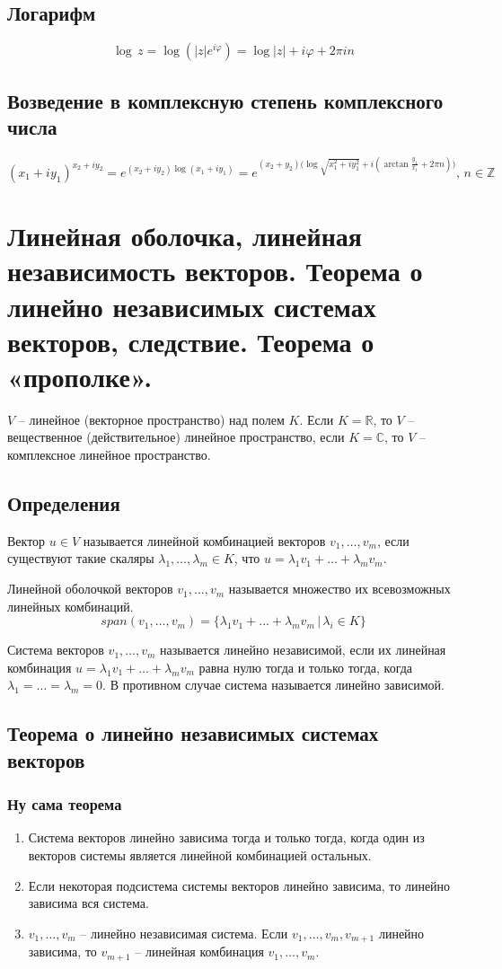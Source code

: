\documentclass{article}
\newcommand{\R}{\mathbb R}
\newcommand{\Z}{\mathbb Z}
\begin{document}
\subsection{Логарифм}
$$ \log\,z=\log(|z|e^{i\varphi})=\log|z|+i\varphi+2\pi i n $$

\subsection{Возведение в комплексную степень комплексного числа}
$$ (x_1+iy_1)^{x_2+iy_2}=e^{(x_2+iy_2)\log(x_1+iy_1)}=e^{(x_2+y_2)\big(\log\sqrt{x_1^2+i y_1^2}+i(\arctan\frac{y_1}{x_1}+2\pi n)\big)},\,n\in\Z$$

\newpage
\section{Линейная оболочка, линейная независимость векторов. Теорема о линейно независимых системах векторов,
следствие. Теорема о «прополке».}
$V$ -- линейное (векторное пространство) над полем $K$. Если $K=\R$, то $V$ -- вещественное
(действительное) линейное пространство, если $K=\mathbb{C}$, то $V$ -- комплексное линейное
пространство.

\subsection{Определения}
Вектор $u\in V$ называется линейной комбинацией векторов $v_1,\ldots,v_m$, если существуют такие скаляры $\lambda_1,\ldots,\lambda_m\in K$, что $u=\lambda_1v_1+\ldots+\lambda_m v_m$.

Линейной оболочкой векторов $v_1,\ldots,v_m$ называется множество их всевозможных линейных комбинаций.
$$ span(v_1,\ldots,v_m)=\{\lambda_1v_1+\ldots+\lambda_m v_m\,|\,\lambda_i\in K\} $$

Система векторов $v_1,\ldots,v_m$ называется линейно независимой, если их линейная комбинация $u=\lambda_1v_1+\ldots+\lambda_m v_m$ равна нулю тогда и только тогда, когда $\lambda_1=\ldots=\lambda_m=0$. В противном случае система называется линейно зависимой.

\subsection{Теорема о линейно независимых системах векторов}
\subsubsection{Ну сама теорема}
\begin{enumerate}
    \item Система векторов линейно зависима тогда и только тогда, когда один из векторов системы является линейной комбинацией остальных.
    \item Если некоторая подсистема системы векторов линейно зависима, то линейно зависима вся система.
    \item $v_1,\ldots,v_m$ -- линейно независимая система. Если $v_1,\ldots,v_m,v_{m+1}$ линейно зависима, то $v_{m+1}$ -- линейная комбинация $v_1,\ldots,v_m$.
\end{enumerate}
\end{document}
